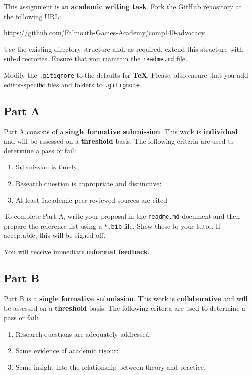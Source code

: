 \documentclass{../../fal_assignment}
\newcommand{\minReferenceCount}{6}
\begin{document}
This assignment is an \textbf{academic writing task}. Fork the GitHub repository at the following URL:

\indent \url{https://github.com/Falmouth-Games-Academy/comp140-advocacy}

Use the existing directory structure and, as required, extend this structure with sub-directories. Ensure that you maintain the \texttt{readme.md} file.

Modify the \texttt{.gitignore} to the defaults for \textbf{TeX}. Please, also ensure that you add editor-specific files and folders to \texttt{.gitignore}. 

\subsection*{Part A}

Part A consists of a \textbf{single formative submission}. This work is \textbf{individual} and will be assessed on a \textbf{threshold} basis. The following criteria are used to determine a pass or fail:

\begin{enumerate}[label=(\alph*)]
	\item Submission is timely;
	\item Research question is appropriate and distinctive;
	\item At least \minReferenceCount  academic peer-reviewed sources are cited.
\end{enumerate}

To complete Part A, write your proposal in the \texttt{readme.md} document and then prepare the reference list using a \texttt{*.bib} file.  Show these to your tutor.  If acceptable, this will be signed-off. 

You will receive immediate \textbf{informal feedback}.

\subsection*{Part B}

Part B is a \textbf{single formative submission}. This work is \textbf{collaborative} and will be assessed on a \textbf{threshold} basis. The following criteria are used to determine a pass or fail:

\begin{enumerate}[label=(\alph*)]
	\item Research questions are adequately addressed;
	\item Some evidence of academic rigour;
	\item Some insight into the relationship between theory and practice.
\end{enumerate}
\end{document}
